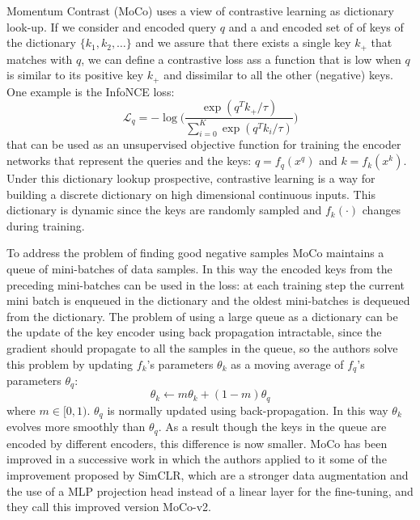 Momentum Contrast (MoCo) \cite{he2020momentum} uses a view of contrastive learning as dictionary look-up. If we consider and encoded query $q$ and a and encoded set of of keys of the dictionary $\{k_1, k_2, \dots\}$ and we assure that there exists a single key $k_+$ that matches with $q$, we can define a contrastive loss ass a function that is low when $q$ is similar to its positive key $k_+$ and dissimilar to all the other (negative) keys. One example is the InfoNCE loss: 
\[ \mathcal{L}_q = - \log\Bigg( \frac{\exp(q^Tk_+/\tau)}{\sum_{i=0}^K \exp(q^T k_i/\tau)}\Bigg)\]
that can be used as an unsupervised objective function for training the encoder networks that represent the queries and the keys: $q = f_q(x^q)$ and $k = f_k(x^k)$. Under this dictionary lookup prospective, contrastive learning is a way for building a discrete dictionary on high dimensional continuous inputs. This dictionary is dynamic since the keys are randomly sampled and $f_k(\cdot)$ changes during training. 

To address the problem of finding good negative samples MoCo maintains a queue of mini-batches of data samples. In this way the encoded keys from the preceding mini-batches can be used in the loss: at each training step the current mini batch is enqueued in the dictionary and the oldest mini-batches is dequeued from the dictionary. The problem of using a large queue as a dictionary can be the update of the key encoder using back propagation intractable, since the gradient should propagate to all the samples in the queue, so the authors solve this problem by updating $f_k$'s parameters $\theta_k$ as a moving average of $f_q$'s parameters $\theta_q$:
\[\theta_k \leftarrow m\theta_k + (1-m)\theta_q \]
where $m \in [0,1)$. $\theta_q$ is normally updated using back-propagation. In this way $\theta_k$ evolves more smoothly than $\theta_q$. As a result though the keys in the queue are encoded by different encoders, this difference is now smaller.
MoCo has been improved in a successive work \cite{chen2020simple} in which the authors applied to it some of the improvement proposed by SimCLR, which are a stronger data augmentation and the use of a MLP projection head instead of a linear layer for the fine-tuning, and they call this improved version MoCo-v2.